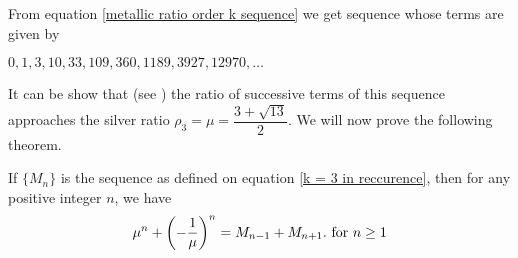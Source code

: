 \documentclass{rmutt-seminar}
\begin{document}
From equation \eqref{metallic ratio order k sequence} we get sequence whose terms are given by 
\begin{center}
	$0,1,3,10,33,109,360,1189,3927,12970,\ldots  $ 
\end{center}

It can be show that (see \cite{R20}) the ratio of successive terms of this sequence approaches the silver ratio
$\rho_{3} = \mu = \dfrac{3 + \sqrt{13}}{2}$. We will now prove the following theorem.
\begin{theorem}\label{bronze ratio theorem}
If $\bigl\{ M_n \bigr\}$ is the sequence as defined on equation \eqref{k = 3 in reccurence},  then for any positive integer $ n $, we have
\begin{equation}\label{silver ratio recursive}
	 \mu^n + \left(-\frac{1}{\mu}\right)^n = M_{n-1} + M_{n+1}.  \textnormal{ for } n \geq 1
\end{equation}
\end{theorem}
\end{document}
